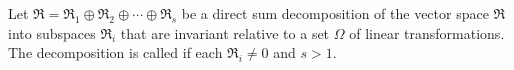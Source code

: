 Let $\mathfrak{R} = \mathfrak{R}_1 \oplus \mathfrak{R}_2 \oplus \cdots \oplus \mathfrak{R}_s$ be a direct sum decomposition of the vector space $\mathfrak{R}$ into subspaces $\mathfrak{R}_i$ that are invariant relative to a set $\Omega$ of linear transformations. The decomposition is called  if each $\mathfrak{R}_i \neq 0$ and $s > 1$.
